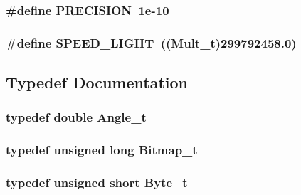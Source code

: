\hypertarget{common-defs_8hpp_9c7b069fee3c8184e14a7de8e5da2dc6}{
\subsubsection[{PRECISION}]{\setlength{\rightskip}{0pt plus 5cm}\#define PRECISION~1e-10}}
\label{common-defs_8hpp_9c7b069fee3c8184e14a7de8e5da2dc6}


\hypertarget{common-defs_8hpp_4ad362d24482ad4f50118d6e5775a02b}{
\subsubsection[{SPEED\_\-LIGHT}]{\setlength{\rightskip}{0pt plus 5cm}\#define SPEED\_\-LIGHT~(({\bf Mult\_\-t})299792458.0)}}
\label{common-defs_8hpp_4ad362d24482ad4f50118d6e5775a02b}




\subsection{Typedef Documentation}
\hypertarget{common-defs_8hpp_65eb9e4da148e3744f9a3a9d3c3dc4bd}{
\subsubsection[{Angle\_\-t}]{\setlength{\rightskip}{0pt plus 5cm}typedef double {\bf Angle\_\-t}}}
\label{common-defs_8hpp_65eb9e4da148e3744f9a3a9d3c3dc4bd}


\hypertarget{common-defs_8hpp_e7a428d359769031670ad716f9182c17}{
\subsubsection[{Bitmap\_\-t}]{\setlength{\rightskip}{0pt plus 5cm}typedef unsigned long {\bf Bitmap\_\-t}}}
\label{common-defs_8hpp_e7a428d359769031670ad716f9182c17}


\hypertarget{common-defs_8hpp_6326115cea41e302927063216072e3a9}{
\subsubsection[{Byte\_\-t}]{\setlength{\rightskip}{0pt plus 5cm}typedef unsigned short {\bf Byte\_\-t}}}
\label{common-defs_8hpp_6326115cea41e302927063216072e3a9}


